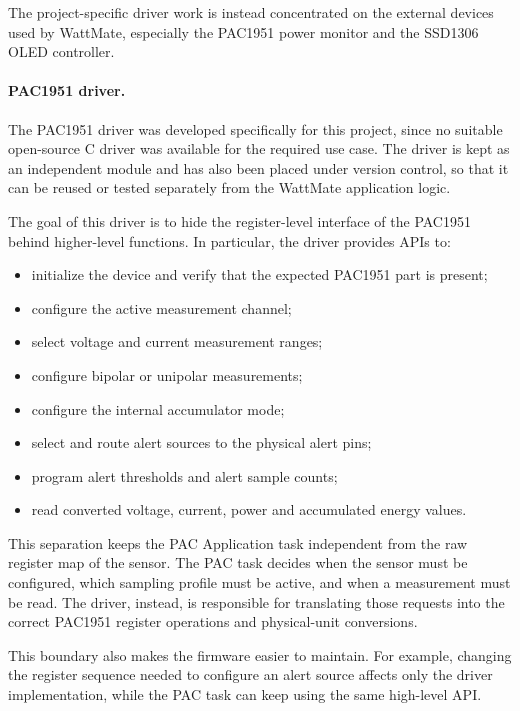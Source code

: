 The project-specific driver work is instead concentrated on the external devices used by WattMate, especially the PAC1951 power monitor and the SSD1306 OLED controller.

\paragraph{PAC1951 driver.}
The PAC1951 driver was developed specifically for this project, since no suitable open-source C driver was available for the required use case. The driver is kept as an independent module and has also been placed under version control, so that it can be reused or tested separately from the WattMate application logic.

The goal of this driver is to hide the register-level interface of the PAC1951 behind higher-level functions. In particular, the driver provides APIs to:

\begin{itemize}
	\item initialize the device and verify that the expected PAC1951 part is present;
	\item configure the active measurement channel;
	\item select voltage and current measurement ranges;
	\item configure bipolar or unipolar measurements;
	\item configure the internal accumulator mode;
	\item select and route alert sources to the physical alert pins;
	\item program alert thresholds and alert sample counts;
	\item read converted voltage, current, power and accumulated energy values.
\end{itemize}

This separation keeps the PAC Application task independent from the raw register map of the sensor. The PAC task decides when the sensor must be configured, which sampling profile must be active, and when a measurement must be read. The driver, instead, is responsible for translating those requests into the correct PAC1951 register operations and physical-unit conversions.

This boundary also makes the firmware easier to maintain. For example, changing the register sequence needed to configure an alert source affects only the driver implementation, while the PAC task can keep using the same high-level API.

